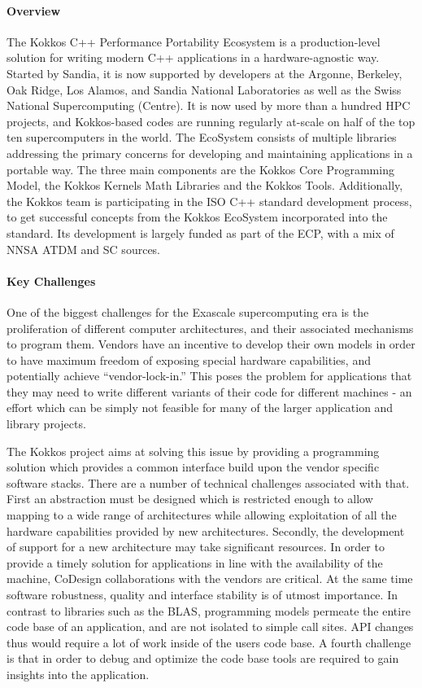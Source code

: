 \paragraph{Overview} 

The Kokkos C++ Performance Portability Ecosystem is a production-level solution for writing modern C++ applications in a hardware-agnostic way.
Started by Sandia, it is now supported by developers at the Argonne, Berkeley, Oak Ridge, Los Alamos, and Sandia National Laboratories as well as the Swiss National Supercomputing (Centre).
It is now used by more than a hundred HPC projects, and Kokkos-based codes are running regularly at-scale on half of the top ten supercomputers in the world. 
The EcoSystem consists of multiple libraries addressing the primary concerns for developing and maintaining applications in a portable way.
The three main components are the Kokkos Core Programming Model, the Kokkos Kernels Math Libraries and the Kokkos Tools.
Additionally, the Kokkos team is participating in the ISO C++ standard development process, to get successful concepts from the Kokkos EcoSystem incorporated into the standard. 
Its development is largely funded as part of the ECP, with a mix of NNSA ATDM and SC sources. 

 
\paragraph{Key Challenges}

One of the biggest challenges for the Exascale supercomputing era is the proliferation of different computer architectures, and their associated mechanisms to program them.
Vendors have an incentive to develop their own models in order to have maximum freedom of exposing special hardware capabilities, and potentially achieve ``vendor-lock-in.''
This poses the problem for applications that they may need to write different variants of their code for different machines - an effort which can be simply not feasible for many of the larger application and library projects.

The Kokkos project aims at solving this issue by providing a programming solution which provides a common interface build upon the vendor specific software stacks.
There are a number of technical challenges associated with that. 
First an abstraction must be designed which is restricted enough to allow mapping to a wide range of architectures while allowing exploitation of all the hardware capabilities provided by new architectures. 
Secondly, the development of support for a new architecture may take significant resources. In order to provide a timely solution for applications in line with the availability of the machine, CoDesign collaborations with the vendors are critical.
At the same time software robustness, quality and interface stability is of utmost importance. 
In contrast to libraries such as the BLAS, programming models permeate the entire code base of an application, and are not isolated to simple call sites. 
API changes thus would require a lot of work inside of the users code base. 
A fourth challenge is that in order to debug and optimize the code base tools are required to gain insights into the application. 

